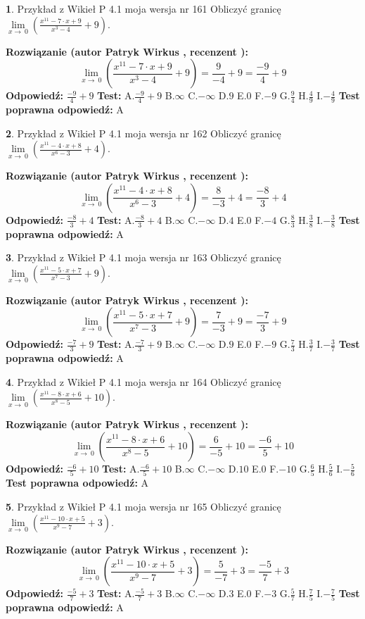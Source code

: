 \documentclass[12pt, a4paper]{article}
\theoremstyle{definition} %
\newtheorem{zad}{}
\newcommand{\zadStart}[1]{\begin{zad}#1\newline}
\newcommand{\zadStop}{\end{zad}}
\newcommand{\rozwStart}[2]{\noindent \textbf{Rozwiązanie (autor #1 , recenzent #2): }\newline}
\newcommand{\rozwStop}{\newline}
\newcommand{\odpStart}{\noindent \textbf{Odpowiedź:}\newline}
\newcommand{\odpStop}{\newline}
\newcommand{\testStart}{\noindent \textbf{Test:}\newline}
\newcommand{\testStop}{\newline}
\newcommand{\kluczStart}{\noindent \textbf{Test poprawna odpowiedź:}\newline}
\newcommand{\kluczStop}{\newline}
\begin{document}
\zadStart{Przykład z Wikieł P 4.1 moja wersja nr 161}
Obliczyć granicę $\lim\limits_{x\to\ 0}(\frac{x^{11}-7 \cdot x +9}{x^{3}-4}+9)$.
\zadStop
\rozwStart{Patryk Wirkus}{}
$$\lim\limits_{x\to\ 0}(\frac{x^{11}-7 \cdot x +9}{x^{3}-4}+9)=\frac{9}{-4}+9=\frac{-9}{4}+9$$
\rozwStop
\odpStart
$\frac{-9}{4}+9$
\odpStop
\testStart
A.$\frac{-9}{4}+9$
B.$\infty$
C.$-\infty$
D.$9$
E.$0$
F.$-9$
G.$\frac{9}{4}$
H.$\frac{4}{9}$
I.$-\frac{4}{9}$
\testStop
\kluczStart
A
\kluczStop



\zadStart{Przykład z Wikieł P 4.1 moja wersja nr 162}
Obliczyć granicę $\lim\limits_{x\to\ 0}(\frac{x^{11}-4 \cdot x +8}{x^{6}-3}+4)$.
\zadStop
\rozwStart{Patryk Wirkus}{}
$$\lim\limits_{x\to\ 0}(\frac{x^{11}-4 \cdot x +8}{x^{6}-3}+4)=\frac{8}{-3}+4=\frac{-8}{3}+4$$
\rozwStop
\odpStart
$\frac{-8}{3}+4$
\odpStop
\testStart
A.$\frac{-8}{3}+4$
B.$\infty$
C.$-\infty$
D.$4$
E.$0$
F.$-4$
G.$\frac{8}{3}$
H.$\frac{3}{8}$
I.$-\frac{3}{8}$
\testStop
\kluczStart
A
\kluczStop



\zadStart{Przykład z Wikieł P 4.1 moja wersja nr 163}
Obliczyć granicę $\lim\limits_{x\to\ 0}(\frac{x^{11}-5 \cdot x +7}{x^{7}-3}+9)$.
\zadStop
\rozwStart{Patryk Wirkus}{}
$$\lim\limits_{x\to\ 0}(\frac{x^{11}-5 \cdot x +7}{x^{7}-3}+9)=\frac{7}{-3}+9=\frac{-7}{3}+9$$
\rozwStop
\odpStart
$\frac{-7}{3}+9$
\odpStop
\testStart
A.$\frac{-7}{3}+9$
B.$\infty$
C.$-\infty$
D.$9$
E.$0$
F.$-9$
G.$\frac{7}{3}$
H.$\frac{3}{7}$
I.$-\frac{3}{7}$
\testStop
\kluczStart
A
\kluczStop



\zadStart{Przykład z Wikieł P 4.1 moja wersja nr 164}
Obliczyć granicę $\lim\limits_{x\to\ 0}(\frac{x^{11}-8 \cdot x +6}{x^{8}-5}+10)$.
\zadStop
\rozwStart{Patryk Wirkus}{}
$$\lim\limits_{x\to\ 0}(\frac{x^{11}-8 \cdot x +6}{x^{8}-5}+10)=\frac{6}{-5}+10=\frac{-6}{5}+10$$
\rozwStop
\odpStart
$\frac{-6}{5}+10$
\odpStop
\testStart
A.$\frac{-6}{5}+10$
B.$\infty$
C.$-\infty$
D.$10$
E.$0$
F.$-10$
G.$\frac{6}{5}$
H.$\frac{5}{6}$
I.$-\frac{5}{6}$
\testStop
\kluczStart
A
\kluczStop



\zadStart{Przykład z Wikieł P 4.1 moja wersja nr 165}
Obliczyć granicę $\lim\limits_{x\to\ 0}(\frac{x^{11}-10 \cdot x +5}{x^{9}-7}+3)$.
\zadStop
\rozwStart{Patryk Wirkus}{}
$$\lim\limits_{x\to\ 0}(\frac{x^{11}-10 \cdot x +5}{x^{9}-7}+3)=\frac{5}{-7}+3=\frac{-5}{7}+3$$
\rozwStop
\odpStart
$\frac{-5}{7}+3$
\odpStop
\testStart
A.$\frac{-5}{7}+3$
B.$\infty$
C.$-\infty$
D.$3$
E.$0$
F.$-3$
G.$\frac{5}{7}$
H.$\frac{7}{5}$
I.$-\frac{7}{5}$
\testStop
\kluczStart
A
\kluczStop
\end{document}
